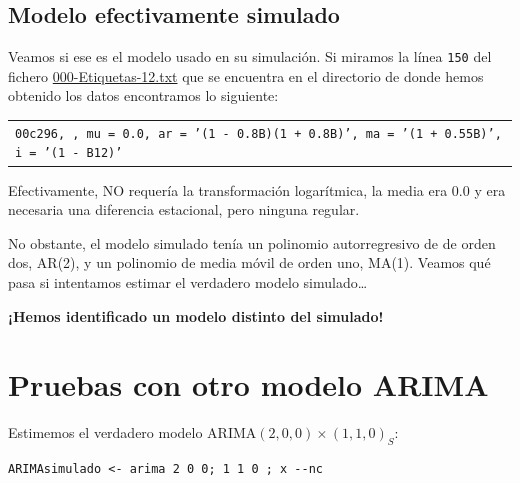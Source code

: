 \documentclass[10pt]{article}
\begin{document}
\subsection*{Modelo efectivamente simulado}
\label{sec:org4e79681}

Veamos si ese es el modelo usado en su simulación. Si miramos la línea
\texttt{150} del fichero \href{IdentificaEstosARIMA/000-Etiquetas-12.txt}{000-Etiquetas-12.txt} que se encuentra en el directorio de
donde hemos obtenido los datos encontramos lo siguiente:
\medskip

\begin{center}
\begin{tabular}{l}
\texttt{00c296,	    ,	mu = 0.0,	ar = '(1 - 0.8B)(1 + 0.8B)', ma = '(1 + 0.55B)', i = '(1 - B12)'}\\
\end{tabular}
\end{center}

\medskip

Efectivamente, NO requería la transformación logarítmica, la media era
\(0.0\) y era necesaria una diferencia estacional, pero ninguna regular.

No obstante, el modelo simulado tenía un polinomio autorregresivo de
de orden dos, AR(2), y un polinomio de media móvil de orden uno,
MA(1). Veamos qué pasa si intentamos estimar el verdadero modelo
simulado\ldots{}

\textbf{¡Hemos identificado un modelo distinto del simulado!}
\section*{Pruebas con otro modelo ARIMA}
\label{sec:org086899d}

Estimemos el verdadero modelo ARIMA\((2,0,0)\times(1,1,0)_{S}\):

\begin{verbatim}
ARIMAsimulado <- arima 2 0 0; 1 1 0 ; x --nc 
\end{verbatim}
\end{document}
